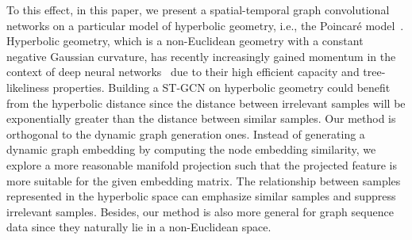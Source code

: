 \documentclass[letterpaper]{article} \usepackage{aaai19}  \usepackage{times}  \usepackage{helvet} \usepackage{courier}  \usepackage[hyphens]{url}  \usepackage{graphicx} \urlstyle{rm} \def\UrlFont{\rm}  \usepackage{graphicx}  \frenchspacing  \setlength{\pdfpagewidth}{8.5in}  \setlength{\pdfpageheight}{11in}
\begin{document}
To this effect, in this paper, we present a spatial-temporal graph convolutional networks on a particular model of hyperbolic geometry, i.e., the Poincaré model~\cite{benedetti2012lectures}. Hyperbolic geometry, which is a non-Euclidean geometry with a constant negative Gaussian curvature, has recently increasingly gained momentum in the context of deep neural networks~\cite{nickel2017poincare,tifrea2018poincar} due to their high efficient capacity and tree-likeliness properties. Building a ST-GCN on hyperbolic geometry could benefit from the hyperbolic distance since the distance between irrelevant samples will be exponentially greater than the distance between similar samples. Our method is orthogonal to the dynamic graph generation ones. Instead of generating a dynamic graph embedding by computing the node embedding similarity, we explore a more reasonable manifold projection such that the projected feature is more suitable for the given embedding matrix. The relationship between samples represented in the hyperbolic space can emphasize similar samples and suppress irrelevant samples. Besides, our method is also more general for graph sequence data since they naturally lie in a non-Euclidean space.
\end{document}
